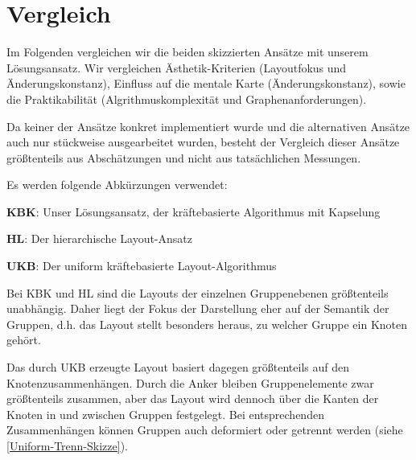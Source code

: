 \section{Vergleich} 
\label{Ansatz-Vergleich}
Im Folgenden vergleichen wir die beiden skizzierten Ansätze mit unserem Lösungsansatz. Wir vergleichen Ästhetik-Kriterien (Layoutfokus und Änderungskonstanz), Einfluss auf die mentale Karte (Änderungskonstanz), sowie die Praktikabilität (Algrithmuskomplexität und Graphenanforderungen).

\pagebreak[4]
Da keiner der Ansätze konkret implementiert wurde und die alternativen Ansätze auch nur stückweise ausgearbeitet wurden, besteht der Vergleich dieser Ansätze größtenteils aus Abschätzungen und nicht aus tatsächlichen Messungen.


Es werden folgende Abkürzungen verwendet:

\textbf{KBK}: Unser Lösungsansatz, der kräftebasierte Algorithmus mit Kapselung

\textbf{HL}: Der hierarchische Layout-Ansatz

\textbf{UKB}: Der uniform kräftebasierte Layout-Algorithmus

Bei KBK und HL sind die Layouts der einzelnen Gruppenebenen größtenteils unabhängig. Daher liegt der Fokus der Darstellung eher auf der Semantik der Gruppen, d.h. das Layout stellt besonders heraus, zu welcher Gruppe ein Knoten gehört.

Das durch UKB erzeugte Layout basiert dagegen größtenteils auf den Knotenzusammenhängen. Durch die Anker bleiben Gruppenelemente zwar größtenteils zusammen, aber das Layout wird dennoch über die Kanten der Knoten in und zwischen Gruppen festgelegt. Bei entsprechenden Zusammenhängen können Gruppen auch deformiert oder getrennt werden (siehe \autoref{Uniform-Trenn-Skizze}).

